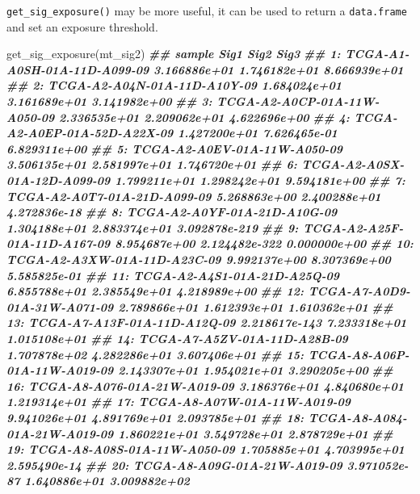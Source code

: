 \documentclass[
  12pt,
  a4paper,
  twoside]{book}
\newenvironment{Shaded}{\begin{snugshade}}{\end{snugshade}}
\newcommand{\DocumentationTok}[1]{\textcolor[rgb]{0.56,0.35,0.01}{\textbf{\textit{#1}}}}
\newcommand{\FunctionTok}[1]{\textcolor[rgb]{0.00,0.00,0.00}{#1}}
\newcommand{\NormalTok}[1]{#1}
\begin{document}
\texttt{get\_sig\_exposure()} may be more useful, it can be used to return a \texttt{data.frame} and set an exposure threshold.

\begin{Shaded}
\begin{Highlighting}[]
\FunctionTok{get\_sig\_exposure}\NormalTok{(mt\_sig2)}
\DocumentationTok{\#\#                            sample          Sig1          Sig2          Sig3}
\DocumentationTok{\#\#   1: TCGA{-}A1{-}A0SH{-}01A{-}11D{-}A099{-}09  3.166886e+01  1.746182e+01  8.666939e+01}
\DocumentationTok{\#\#   2: TCGA{-}A2{-}A04N{-}01A{-}11D{-}A10Y{-}09  1.684024e+01  3.161689e+01  3.141982e+00}
\DocumentationTok{\#\#   3: TCGA{-}A2{-}A0CP{-}01A{-}11W{-}A050{-}09  2.336535e+01  2.209062e+01  4.622696e+00}
\DocumentationTok{\#\#   4: TCGA{-}A2{-}A0EP{-}01A{-}52D{-}A22X{-}09  1.427200e+01  7.626465e{-}01  6.829311e+00}
\DocumentationTok{\#\#   5: TCGA{-}A2{-}A0EV{-}01A{-}11W{-}A050{-}09  3.506135e+01  2.581997e+01  1.746720e+01}
\DocumentationTok{\#\#   6: TCGA{-}A2{-}A0SX{-}01A{-}12D{-}A099{-}09  1.799211e+01  1.298242e+01  9.594181e+00}
\DocumentationTok{\#\#   7: TCGA{-}A2{-}A0T7{-}01A{-}21D{-}A099{-}09  5.268863e+00  2.400288e+01  4.272836e{-}18}
\DocumentationTok{\#\#   8: TCGA{-}A2{-}A0YF{-}01A{-}21D{-}A10G{-}09  1.304188e+01  2.883374e+01 3.092878e{-}219}
\DocumentationTok{\#\#   9: TCGA{-}A2{-}A25F{-}01A{-}11D{-}A167{-}09  8.954687e+00 2.124482e{-}322  0.000000e+00}
\DocumentationTok{\#\#  10: TCGA{-}A2{-}A3XW{-}01A{-}11D{-}A23C{-}09  9.992137e+00  8.307369e+00  5.585825e{-}01}
\DocumentationTok{\#\#  11: TCGA{-}A2{-}A4S1{-}01A{-}21D{-}A25Q{-}09  6.855788e+01  2.385549e+01  4.218989e+00}
\DocumentationTok{\#\#  12: TCGA{-}A7{-}A0D9{-}01A{-}31W{-}A071{-}09  2.789866e+01  1.612393e+01  1.610362e+01}
\DocumentationTok{\#\#  13: TCGA{-}A7{-}A13F{-}01A{-}11D{-}A12Q{-}09 2.218617e{-}143  7.233318e+01  1.015108e+01}
\DocumentationTok{\#\#  14: TCGA{-}A7{-}A5ZV{-}01A{-}11D{-}A28B{-}09  1.707878e+02  4.282286e+01  3.607406e+01}
\DocumentationTok{\#\#  15: TCGA{-}A8{-}A06P{-}01A{-}11W{-}A019{-}09  2.143307e+01  1.954021e+01  3.290205e+00}
\DocumentationTok{\#\#  16: TCGA{-}A8{-}A076{-}01A{-}21W{-}A019{-}09  3.186376e+01  4.840680e+01  1.219314e+01}
\DocumentationTok{\#\#  17: TCGA{-}A8{-}A07W{-}01A{-}11W{-}A019{-}09  9.941026e+01  4.891769e+01  2.093785e+01}
\DocumentationTok{\#\#  18: TCGA{-}A8{-}A084{-}01A{-}21W{-}A019{-}09  1.860221e+01  3.549728e+01  2.878729e+01}
\DocumentationTok{\#\#  19: TCGA{-}A8{-}A08S{-}01A{-}11W{-}A050{-}09  1.705885e+01  4.703995e+01  2.595490e{-}14}
\DocumentationTok{\#\#  20: TCGA{-}A8{-}A09G{-}01A{-}21W{-}A019{-}09  3.971052e{-}87  1.640886e+01  3.009882e+02}

\end{Highlighting}
\end{Shaded}
\end{document}
